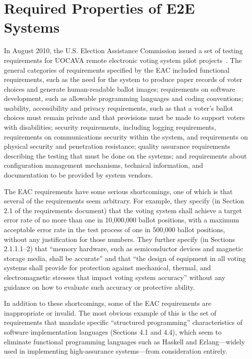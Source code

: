 \chapter{Required Properties of E2E Systems}
\label{chapter:required_properties}

In August 2010, the U.S. Election Assistance Commission issued a set
of testing requirements for UOCAVA remote electronic voting system
pilot projects~\cite{eac-uocava2010}. The general categories of
requirements specified by the EAC included functional requirements,
such as the need for the system to produce paper records of voter
choices and generate human-readable ballot images; requirements on
software development, such as allowable programming languages and
coding conventions; usability, accessibility and privacy requirements,
such as that a voter's ballot choices must remain private and that
provisions must be made to support voters with disabilities; security
requirements, including logging requirements, requirements on
communications security within the system, and requirements on
physical security and penetration resistance; quality assurance
requirements describing the testing that must be done on the systems;
and requirements about configuration management mechanisms, technical
information, and documentation to be provided by system vendors.

The EAC requirements have some serious shortcomings, one of which is that several
of the requirements seem arbitrary. For example, they specify (in
Section 2.1 of the requirements document) that the voting system shall
achieve a target error rate of no more than one in 10,000,000 ballot
positions, with a maximum acceptable error rate in the test process of
one in 500,000 ballot positions, without any justification for those
numbers. They further specify (in Sections 2.1.1.1--2) that ``memory
hardware, such as semiconductor devices and magnetic storage media,
shall be accurate'' and that ``the design of equipment in all voting
systems shall provide for protection against mechanical, thermal, and
electromagnetic stresses that impact voting system accuracy'' without
any guidance on how to evaluate such accuracy or protective ability.

In addition to these shortcomings, some of the EAC requirements are
inappropriate or invalid. The most obvious example of this is the set
of requirements that mandate specific ``structured programming''
characteristics of software implementation languages (Sections 4.1 and
4.4), which seem to eliminate functional programming languages such as
Haskell and Erlang---widely used in implementing high-assurance
systems---from consideration entirely.


